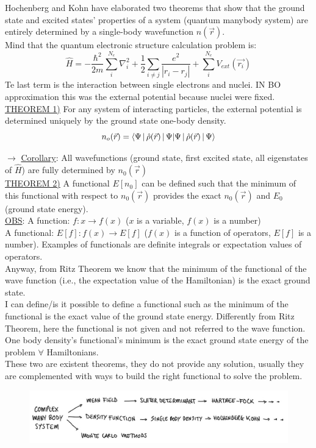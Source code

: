 Hochenberg and Kohn have elaborated two theorems that show that the ground state and excited states' properties of a system (quantum manybody system) are entirely determined by a single-body wavefunction $n(\vec{r})$.\\
Mind that the quantum electronic structure calculation problem is:
\[
\hat{H}=-\frac{\hbar^2}{2m}\sum_i^{N_e}\nabla_i^2+\frac{1}{2}\sum_{i\neq j} \frac{e^2}{|r_i-r_j|}+\sum_i^{N_e}V_{ext}(\vec{r_i})
\]
Te last term is the interaction between single electrons and nuclei. IN BO approximation this was the external potential because nuclei were fixed.\\

\ul{THEOREM 1)} For any system of interacting particles, the external potential is determined uniquely by the ground state one-body density.
\[n_o(\vec{r})=\braket{\Psi\,|\,\hat{\rho}(\vec{r})\,|\,\Psi}\]

$\rightarrow\,\,$\ul{Corollary}: All wavefunctions (ground state, first excited state, all eigenstates of $\hat{H}$) are fully determined by $n_0(\vec{r})$\\

\ul{THEOREM 2)} A functional $E[n_0]$ can be defined such that the minimum of this functional with respect to $n_0(\vec{r})$ provides the exact $n_0(\vec{r})$ and $E_0$ (ground state energy).\\

\ul{OBS}: A function: $f: x \rightarrow f(x)$ ($x$ is a variable, $f(x)$ is a number)\\
A functional: $E[f]: f(x) \rightarrow E[f]$ ($f(x)$ is a function of operators, $E[f]$ is a number). Examples of functionals are definite integrals or expectation values of operators.\\
Anyway, from Ritz Theorem we know that the minimum of the functional of the wave function (i.e., the expectation value of the Hamiltonian) is the exact ground state.\\

I can define/is it possible to define a functional such as the minimum of the functional is the exact value of the ground state energy. Differently from Ritz Theorem, here the functional is not given and not referred to the wave function. One body density's functional's minimum is the exact ground state energy of the problem $\forall$ Hamiltonians.\\

These two are existent theorems, they do not provide any solution, usually they are complemented with ways to build the right functional to solve the problem.\\
\begin{figure}[htbp!]
	\centering
	\includegraphics[scale=0.30]{img_15}
\end{figure}

